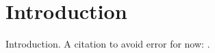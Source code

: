 \chapter*{Introduction}
Introduction. A citation to avoid error for now: \cite{li_evolving_2016}.





